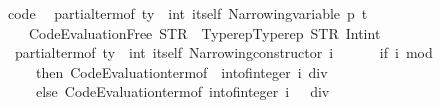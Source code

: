 \begin{isabellebody}
\isanewline
{}\isamarkupfalse%
\ {\isacharbrackleft}{\kern0pt}code{\isacharbrackright}{\kern0pt}{\isacharcolon}{\kern0pt}\isanewline
\ \ {\isachardoublequoteopen}partial{\isacharunderscore}{\kern0pt}term{\isacharunderscore}{\kern0pt}of\ {\isacharparenleft}{\kern0pt}ty\ {\isacharcolon}{\kern0pt}{\isacharcolon}{\kern0pt}\ int\ itself{\isacharparenright}{\kern0pt}\ {\isacharparenleft}{\kern0pt}Narrowing{\isacharunderscore}{\kern0pt}variable\ p\ t{\isacharparenright}{\kern0pt}\ {\isasymequiv}\isanewline
\ \ \ \ Code{\isacharunderscore}{\kern0pt}Evaluation{\isachardot}{\kern0pt}Free\ {\isacharparenleft}{\kern0pt}STR\ {\isacharprime}{\kern0pt}{\isacharprime}{\kern0pt}{\isacharunderscore}{\kern0pt}{\isacharprime}{\kern0pt}{\isacharprime}{\kern0pt}{\isacharparenright}{\kern0pt}\ {\isacharparenleft}{\kern0pt}Typerep{\isachardot}{\kern0pt}Typerep\ {\isacharparenleft}{\kern0pt}STR\ {\isacharprime}{\kern0pt}{\isacharprime}{\kern0pt}Int{\isachardot}{\kern0pt}int{\isacharprime}{\kern0pt}{\isacharprime}{\kern0pt}{\isacharparenright}{\kern0pt}\ {\isacharbrackleft}{\kern0pt}{\isacharbrackright}{\kern0pt}{\isacharparenright}{\kern0pt}{\isachardoublequoteclose}\isanewline
\ \ {\isachardoublequoteopen}partial{\isacharunderscore}{\kern0pt}term{\isacharunderscore}{\kern0pt}of\ {\isacharparenleft}{\kern0pt}ty\ {\isacharcolon}{\kern0pt}{\isacharcolon}{\kern0pt}\ int\ itself{\isacharparenright}{\kern0pt}\ {\isacharparenleft}{\kern0pt}Narrowing{\isacharunderscore}{\kern0pt}constructor\ i\ {\isacharbrackleft}{\kern0pt}{\isacharbrackright}{\kern0pt}{\isacharparenright}{\kern0pt}\ {\isasymequiv}\isanewline
\ \ \ \ {\isacharparenleft}{\kern0pt}if\ i\ mod\ {}\ {\isacharequal}{\kern0pt}\ {}\isanewline
\ \ \ \ \ then\ Code{\isacharunderscore}{\kern0pt}Evaluation{\isachardot}{\kern0pt}term{\isacharunderscore}{\kern0pt}of\ {\isacharparenleft}{\kern0pt}{\isacharminus}{\kern0pt}\ {\isacharparenleft}{\kern0pt}int{\isacharunderscore}{\kern0pt}of{\isacharunderscore}{\kern0pt}integer\ i{\isacharparenright}{\kern0pt}\ div\ {}{\isacharparenright}{\kern0pt}\isanewline
\ \ \ \ \ else\ Code{\isacharunderscore}{\kern0pt}Evaluation{\isachardot}{\kern0pt}term{\isacharunderscore}{\kern0pt}of\ {\isacharparenleft}{\kern0pt}{\isacharparenleft}{\kern0pt}int{\isacharunderscore}{\kern0pt}of{\isacharunderscore}{\kern0pt}integer\ i\ {\isacharplus}{\kern0pt}\ {}{\isacharparenright}{\kern0pt}\ div\ {}{\isacharparenright}{\kern0pt}{\isacharparenright}{\kern0pt}{\isachardoublequoteclose}\isanewline
%
\isadelimproof
\ \ %
\endisadelimproof
%

\end{isabellebody}
